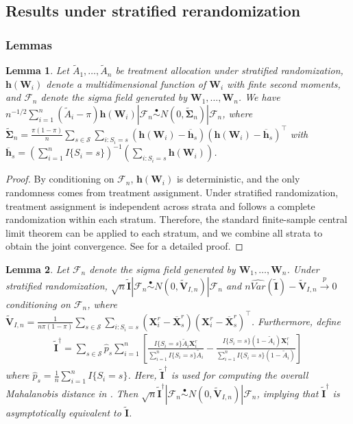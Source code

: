\documentclass[12pt]{article}
\newtheorem{lemma}{Lemma}
\newcommand{\bX}{\boldsymbol{X}}
\newcommand{\bW}{\boldsymbol{W}}
\newcommand{\bI}{\boldsymbol{I}}
\newcommand{\bh}{\boldsymbol{h}}
\newcommand{\bSigma}{\mathbf{\Sigma}}
\newcommand{\bfV}{\mathbf{V}}
\newcommand{\tA}{\widetilde{A}}
\begin{document}
\subsection{Results under stratified rerandomization}
\subsubsection{Lemmas}

\begin{lemma}\label{lemma:stratified}
Let $\tA_1,\dots, \tA_n$ be treatment allocation under stratified randomization, $\bh(\bW_i)$ denote a multidimensional function of $\bW_i$ with finte second moments, and $\mathcal{F}_n$ denote the sigma field generated by $\bW_1,\dots, \bW_n$. We have $n^{-1/2} \sum_{i=1}^n (\tA_i - \pi) \bh(\bW_i) | \mathcal{F}_n \overset{\bullet}{\sim} N(0, \widetilde{\bSigma}_n) | \mathcal{F}_n$, where $\widetilde{\bSigma}_n = \frac{\pi(1-\pi)}{n}\sum_{s \in \mathcal{S}} \sum_{i: S_i = s} (\bh(\bW_i) - \overline{\bh}_s)(\bh(\bW_i) - \overline{\bh}_s)^\top$ with \\
$\overline{\bh}_s = (\sum_{i=1}^n I\{S_i=s\})^{-1}(\sum_{i: S_i = s} \bh(\bW_i))$.
\end{lemma}

\begin{proof}
By conditioning on $\mathcal{F}_n$, $\bh(\bW_i)$ is deterministic, and the only randomness comes from treatment assignment. Under stratified randomization, treatment assignment is independent across strata and follows a complete randomization within each stratum. Therefore, the standard finite-sample central limit theorem \citep{li2017general} can be applied to each stratum, and we combine all strata to obtain the joint convergence. See \cite{pirondini2022covariate} for a detailed proof. 
\end{proof}

\begin{lemma}\label{lemma3}
Let $\mathcal{F}_n$ denote the sigma field generated by $\bW_1,\dots, \bW_n$.
    Under stratified randomization, $\sqrt{n}\widetilde{\bI}|\mathcal{F}_n \overset{\bullet}{\sim} N(0, \widetilde{\bfV}_{I,n})|\mathcal{F}_n$ and $n\widehat{Var}(\widetilde{\bI}) - \widetilde{\bfV}_{I,n} \xrightarrow{p}0$ conditioning on $\mathcal{F}_n$,  where $\widetilde{\bfV}_{I,n} = \frac{1}{n\pi(1-\pi)}\sum_{s \in \mathcal{S}} \sum_{i: S_i = s} (\bX_i^r - \overline{\bX}_s^r)(\bX_i^r - \overline{\bX}_s^r)^\top$. Furthermore, define
    \begin{align*}
        \widetilde{\bI}^{\dagger} = \sum_{s \in \mathcal{S}} \widehat{p}_s\sum_{i=1}^n \left[\frac{I\{S_i=s\}\tA_i\bX_i^r}{\sum_{i=1}^n I\{S_i=s\}\tA_i} - \frac{I\{S_i=s\}(1-\tA_i)\bX_i^r}{\sum_{i=1}^n I\{S_i=s\}(1-\tA_i)}\right]
    \end{align*}
    where $\widehat{p}_s=\frac{1}{n}\sum_{i=1}^n I\{S_i=s\}$. Here, $\widetilde{\bI}^{\dagger}$ is used for computing the overall Mahalanobis distance in \cite{wang2022rerandomization}. Then $\sqrt{n}\widetilde{\bI}^{\dagger}|\mathcal{F}_n \overset{\bullet}{\sim} N(0, \widetilde{\bfV}_{I,n})|\mathcal{F}_n$, implying that $\widetilde{\bI}^{\dagger}$ is asymptotically equivalent to $\widetilde{\bI}$.
\end{lemma}
\end{document}
